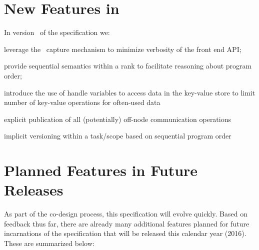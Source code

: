 \section{New Features in \specVersion}
\label{sec:current}
In version \specVersion\ of the specification we:
  \begin{compactenum}
\item leverage the \CC\ \gls{capture} mechanism to minimize verbosity of the \gls{front end}
    \gls{API};  
\item provide \gls{sequential semantics} within a \gls{rank} to
    facilitate reasoning about program order; 
\item introduce the use of
    \gls{handle} variables to access data in the \gls{key-value store} to limit number of key-value operations for often-used data
\item explicit publication of all (potentially) off-node communication
operations
\item implicit versioning within a task/scope based on sequential program order    
    \end{compactenum}


\section{Planned Features in Future Releases}
\label{sec:future}

As part of the \gls{co-design} process, this specification will evolve quickly.
  Based on feedback thus far, there are already
many additional features planned for future incarnations of the specification that
will be released this calendar year (2016).  These are summarized below:

